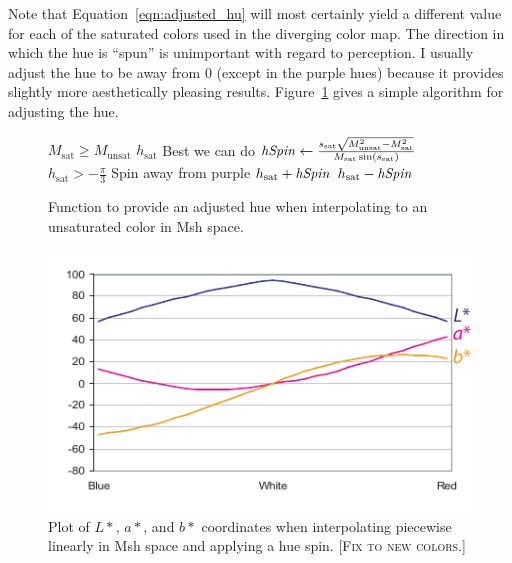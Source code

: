 \documentclass[review,journal]{vgtc}         %
\newcommand{\sticky}[1]{\textsc{[#1]}}
\newcommand{\Msh}{Msh\xspace}
\begin{document}
Note that Equation~\ref{eqn:adjusted_hu} will most certainly yield a
different value for each of the saturated colors used in the diverging
color map.  The direction in which the hue is ``spun'' is unimportant with
regard to perception.  I usually adjust the hue to be away from 0 (except
in the purple hues) because it provides slightly more aesthetically
pleasing results.  Figure~\ref{fig:AdjustHue} gives a simple algorithm for
adjusting the hue.

\begin{figure}
  \begin{codebox}
    \li \If $M_\mathrm{sat} \geq M_\mathrm{unsat}$
    \li \Then \Return $h_\mathrm{sat}$ \RComment Best we can do
    \li \Else $\id{hSpin} \leftarrow
                 \frac{s_\mathrm{sat}\sqrt{M_\mathrm{unsat}^2-M_\mathrm{sat}^2}}
		      {M_\mathrm{sat} \sin(s_\mathrm{sat})}$
    \li       \If $h_\mathrm{sat} > -\frac{\pi}{3}$ \RComment Spin away from purple
    \li       \Then \Return $h_\mathrm{sat} + \id{hSpin}$
    \li       \Else \Return $h_\mathrm{sat} - \id{hSpin}$
              \End
        \End
  \end{codebox}
  \caption{Function to provide an adjusted hue when interpolating to an
    unsaturated color in \Msh space.}
  \label{fig:AdjustHue}
\end{figure}

\begin{figure}
  \centering
  \includegraphics{images/HueSpinPlot}
  \caption{Plot of $L*$, $a*$, and $b*$ coordinates when interpolating
    piecewise linearly in \Msh space and applying a hue spin. \sticky{Fix
      to new colors.}}
  \label{fig:hue_spin_plot}
\end{figure}
\end{document}
